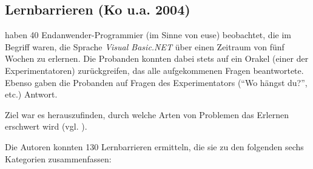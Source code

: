 \subsection{Lernbarrieren (Ko u.a. 2004)}

\cite{AndrewJKo:2004df} haben 40 Endanwender-Programmier (im Sinne von \acrshort{euse}) beobachtet, die im Begriff waren, die Sprache \textit{Visual Basic.NET} über einen Zeitraum von fünf Wochen zu erlernen. Die Probanden konnten dabei stets auf ein Orakel (einer der Experimentatoren) zurückgreifen, das alle aufgekommenen Fragen beantwortete. Ebenso gaben die Probanden auf Fragen des Experimentators (``Wo hängst du?'', etc.) Antwort.

Ziel war es herauszufinden, durch welche Arten von Problemen das Erlernen erschwert wird (vgl. ).

Die Autoren konnten 130 Lernbarrieren ermitteln, die sie zu den folgenden sechs Kategorien zusammenfassen:

